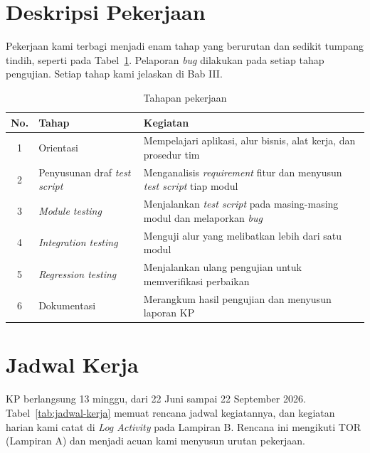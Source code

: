 \section{Deskripsi Pekerjaan}
Pekerjaan kami terbagi menjadi enam tahap yang berurutan dan sedikit tumpang tindih, seperti pada Tabel~\ref{tab:tahap-pekerjaan}. Pelaporan \textit{bug} dilakukan pada setiap tahap pengujian. Setiap tahap kami jelaskan di Bab III.

\begin{table}[H]
\caption{Tahapan pekerjaan}
\label{tab:tahap-pekerjaan}
\centering
\begin{tabularx}{\textwidth}{|c|p{3.4cm}|X|}
\hline
\textbf{No.} & \textbf{Tahap} & \textbf{Kegiatan} \\
\hline
1 & Orientasi & Mempelajari aplikasi, alur bisnis, alat kerja, dan prosedur tim \\
\hline
2 & Penyusunan draf \textit{test script} & Menganalisis \textit{requirement} fitur dan menyusun \textit{test script} tiap modul \\
\hline
3 & \textit{Module testing} & Menjalankan \textit{test script} pada masing-masing modul dan melaporkan \textit{bug} \\
\hline
4 & \textit{Integration testing} & Menguji alur yang melibatkan lebih dari satu modul \\
\hline
5 & \textit{Regression testing} & Menjalankan ulang pengujian untuk memverifikasi perbaikan \\
\hline
6 & Dokumentasi & Merangkum hasil pengujian dan menyusun laporan KP \\
\hline
\end{tabularx}
\end{table}

\section{Jadwal Kerja}
KP berlangsung 13 minggu, dari 22 Juni sampai 22 September 2026. Tabel~\ref{tab:jadwal-kerja} memuat rencana jadwal kegiatannya, dan kegiatan harian kami catat di \textit{Log Activity} pada Lampiran B. Rencana ini mengikuti TOR (Lampiran A) dan menjadi acuan kami menyusun urutan pekerjaan.

